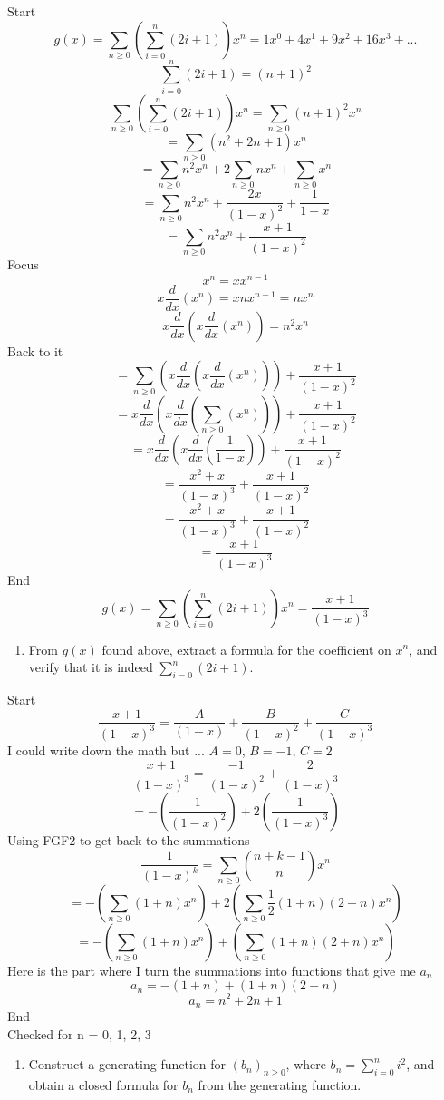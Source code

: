 \documentclass[10pt, AMS Euler]{article}
\newcommand{\ds}{\displaystyle}
\begin{document}
        Start
        $$ g(x) = \sum_{n\geq0} ( \sum_{i=0}^n (2i+1) ) x^n = 1x^0 + 4x^1 + 9x^2 + 16x^3 + ... $$
        $$ \sum_{i=0}^n (2i+1) = (n+1)^2 $$
        $$ \sum_{n\geq0} ( \sum_{i=0}^n (2i+1) ) x^n = \sum_{n\geq0} (n+1)^2 x^n $$
        $$ = \sum_{n\geq0} (n^2+2n+1) x^n $$
        $$ = \sum_{n\geq0} n^2 x^n + 2 \sum_{n\geq0} n x^n + \sum_{n\geq0} x^n $$
        $$ = \sum_{n\geq0} n^2 x^n + \frac{2x}{(1-x)^2} + \frac{1}{1-x} $$
        $$ = \sum_{n\geq0} n^2 x^n + \frac{x+1}{(1-x)^2} $$
        Focus 
        $$ x^n = xx^{n-1} $$
        $$ x \frac{d}{dx} (x^n) = x n x^{n-1} = n x^n $$ 
        $$ x \frac{d}{dx} (x \frac{d}{dx} ( x^n ) ) = n^2 x^n $$
        Back to it
        $$ = \sum_{n\geq0} (x \frac{d}{dx} ( x \frac{d}{dx} (x^n))) + \frac{x+1}{(1-x)^2} $$
        $$ = x \frac{d}{dx} ( x \frac{d}{dx} ( \sum_{n\geq0} (x^n) )) + \frac{x+1}{(1-x)^2} $$
        $$ = x \frac{d}{dx} ( x \frac{d}{dx} ( \frac{1}{1-x} )) + \frac{x+1}{(1-x)^2} $$
        $$ = \frac{x^2 + x}{(1-x)^3} + \frac{x+1}{(1-x)^2} $$
        $$ = \frac{x^2 + x}{(1-x)^3} + \frac{x+1}{(1-x)^2} $$
        $$ = \frac{x+1}{(1-x)^3} $$
        End
        $$ g(x) = \sum_{n\geq0} ( \sum_{i=0}^n (2i+1) ) x^n = \frac{x+1}{(1-x)^3} $$

        
        \newpage
        \begin{enumerate}[resume]
		\item From $g(x)$ found above, extract a formula for the coefficient on $x^n$, and verify that it is indeed $\ds\sum_{i=0}^n(2i+1)$.
        \end{enumerate}

        Start
        $$ \frac{x+1}{(1-x)^3} = \frac{A}{(1-x)} + \frac{B}{(1-x)^2} + \frac{C}{(1-x)^3} $$
        I could write down the math but ...  $A = 0$, $B=-1$, $C=2$
        $$ \frac{x+1}{(1-x)^3} = \frac{-1}{(1-x)^2} + \frac{2}{(1-x)^3} $$
        $$ = - (\frac{1}{(1-x)^2}) + 2 (\frac{1}{(1-x)^3}) $$
        Using FGF2 to get back to the summations
        $$ \frac{1}{(1-x)^k} = \sum_{n\geq0} \binom{n+k-1}{n} x^n $$
        $$ = - ( \sum_{n\geq0} (1+n) x^n ) + 2 ( \sum_{n\geq0} \frac{1}{2} (1+n)(2+n) x^n ) $$
        $$ = - ( \sum_{n\geq0} (1+n) x^n ) + ( \sum_{n\geq0} (1+n)(2+n) x^n ) $$
        Here is the part where I turn the summations into functions that give me $a_n$
        $$ a_n = - (1+n) + (1+n)(2+n)  $$
        $$ a_n = n^2 + 2n + 1  $$
        End \\
        Checked for n = 0, 1, 2, 3

        \newpage
	\begin{enumerate}[resume]
		\item Construct a generating function for $(b_n)_{n \geq 0}$, where $b_n = \ds \sum_{i=0}^n i^2$, and obtain a closed formula for $b_n$ from the generating function. 
	\end{enumerate}
\end{document}
